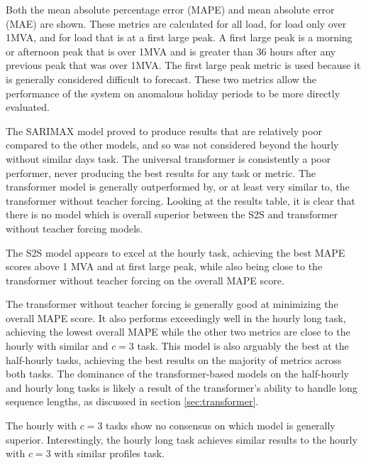 Both the mean absolute percentage error (MAPE) and mean absolute error (MAE) are shown.
These metrics are calculated for all load, for load only over 1MVA, and for load that is at a first large peak.
A first large peak is a morning or afternoon peak that is over 1MVA and is greater than 36 hours after any previous peak that was over 1MVA.
The first large peak metric is used because it is generally considered difficult to forecast.
These two metrics allow the performance of the system on anomalous holiday periods to be more directly evaluated.

The SARIMAX model proved to produce results that are relatively poor compared to the other models, and so was not considered beyond the hourly without similar days task.
The universal transformer is consistently a poor performer, never producing the best results for any task or metric.
The transformer model is generally outperformed by, or at least very similar to, the transformer without teacher forcing.
Looking at the results table, it is clear that there is no model which is overall superior between the S2S and transformer without teacher forcing models.

The S2S model appears to excel at the hourly task, achieving the best MAPE scores above 1 MVA and at first large peak, while also being close to the transformer without teacher forcing on the overall MAPE score.

The transformer without teacher forcing is generally good at minimizing the overall MAPE score.
It also performs exceedingly well in the hourly long task, achieving the lowest overall MAPE while the other two metrics are close to the hourly with similar and $c=3$ task.
This model is also arguably the best at the half-hourly tasks, achieving the best results on the majority of metrics across both tasks.
The dominance of the transformer-based models on the half-hourly and hourly long tasks is likely a result of the transformer's ability to handle long sequence lengths,
as discussed in section \ref{sec:transformer}.

The hourly with $c=3$ tasks show no consensus on which model is generally superior.
Interestingly, the hourly long task achieves similar results to the hourly with $c=3$ with similar profiles task.

